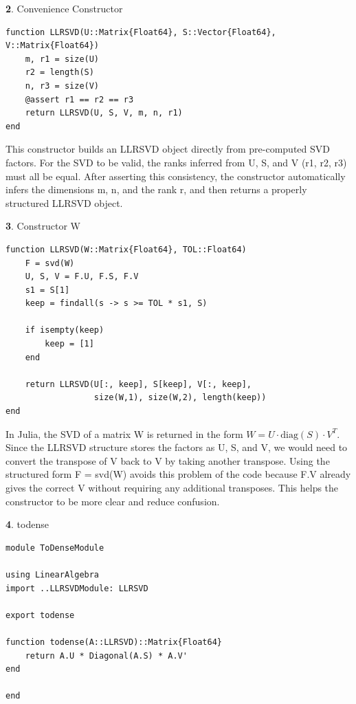 \documentclass[11pt]{article}
\begin{document}
\textbf{2}. Convenience Constructor

\begin{lstlisting}
function LLRSVD(U::Matrix{Float64}, S::Vector{Float64}, V::Matrix{Float64})
    m, r1 = size(U)
    r2 = length(S)
    n, r3 = size(V)
    @assert r1 == r2 == r3
    return LLRSVD(U, S, V, m, n, r1)
end
\end{lstlisting}

This constructor builds an LLRSVD object directly from pre-computed SVD factors. For the SVD to be valid, the ranks inferred from U, S, and V (r1, r2, r3) must all be equal. After asserting this consistency, the constructor automatically infers the dimensions m, n, and the rank r, and then returns a properly structured LLRSVD object.

\vspace{1.5em}

\textbf{3}. Constructor W

\begin{lstlisting}
function LLRSVD(W::Matrix{Float64}, TOL::Float64)
    F = svd(W)
    U, S, V = F.U, F.S, F.V
    s1 = S[1]
    keep = findall(s -> s >= TOL * s1, S)

    if isempty(keep)
        keep = [1]
    end

    return LLRSVD(U[:, keep], S[keep], V[:, keep],
                  size(W,1), size(W,2), length(keep))
end
\end{lstlisting}

In Julia, the SVD of a matrix W is returned in the form 
$W = U \cdot \mathrm{diag}(S) \cdot V^T$.  Since the LLRSVD structure stores the factors as U, S, and V, we would need to convert the transpose of V back to V by taking another transpose. Using the structured form F = svd(W) avoids this problem of the code because F.V already gives the correct V without requiring any additional transposes. This helps the constructor to be more clear and reduce confusion.

\vspace{1.5em}

\textbf{4}. todense 

\begin{lstlisting}
module ToDenseModule

using LinearAlgebra
import ..LLRSVDModule: LLRSVD

export todense

function todense(A::LLRSVD)::Matrix{Float64}
    return A.U * Diagonal(A.S) * A.V'
end

end 

\end{lstlisting}
\end{document}
